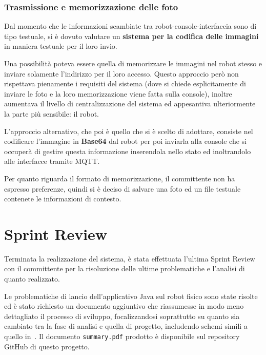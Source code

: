 \subsubsection{Trasmissione e memorizzazione delle foto}

Dal momento che le informazioni scambiate tra robot-console-interfaccia sono di tipo testuale, si è dovuto valutare un \textbf{sistema per la codifica delle immagini} in maniera testuale per il loro invio.

Una possibilità poteva essere quella di memorizzare le immagini nel robot stesso e inviare solamente l'indirizzo per il loro accesso.
Questo approccio però non rispettava pienamente i requisiti del sistema (dove si chiede esplicitamente di inviare le foto e la loro memorizzazione viene fatta sulla console), inoltre aumentava il livello di centralizzazione del sistema ed appesantiva ulteriormente la parte più sensibile: il robot.

L'approccio alternativo, che poi è quello che si è scelto di adottare, consiste nel codificare l'immagine in \textbf{Base64} dal robot per poi inviarla alla console che si occuperà di gestire questa informazione inserendola nello stato ed inoltrandolo alle interfacce tramite MQTT\@.

Per quanto riguarda il formato di memorizzazione, il committente non ha espresso preferenze, quindi si è deciso di salvare una foto ed un file testuale contenete le informazioni di contesto.

\section{Sprint Review}

Terminata la realizzazione del sistema, è stata effettuata l'ultima Sprint Review con il committente per la risoluzione delle ultime problematiche e l'analisi di quanto realizzato.

Le problematiche di lancio dell'applicativo Java sul robot fisico sono state risolte ed è stato richiesto un documento aggiuntivo che riassumesse in modo meno dettagliato il processo di sviluppo, focalizzandosi soprattutto su quanto sia cambiato tra la fase di analisi e quella di progetto, includendo schemi simili a quello in~.
Il documento \texttt{summary.pdf} prodotto è disponibile sul repository GitHub di questo progetto.

